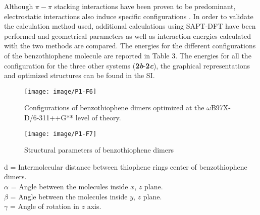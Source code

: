 	Although $\pi-\pi$ stacking interactions have been proven to be predominant, electrostatic interactions also induce specific configurations \cite{liu2014adjusting}. In order to validate the calculation method used, additional calculations using SAPT-DFT have been performed and geometrical parameters as well as interaction energies calculated with the two methods are compared. The energies for the different configurations of the benzothiophene molecule are reported in Table 3. The energies for all the configuration for the three other systems (\textbf{2\textit{b}}-\textbf{2\textit{c}}), the graphical representations and optimized structures can be found in the SI.
	
	
	\begin{figure}[H]
		\centering
		\texttt{[image: image/P1-F6]} \label{P1-F6}
		\caption{Configurations of benzothiophene dimers optimized at the $\omega$B97X-D/6-311++G** level of theory.}
	\end{figure}
	
	\begin{figure}[H]
		\centering
		\texttt{[image: image/P1-F7]}  \label{P1-F7}
		\caption{Structural parameters of benzothiophene dimers}
	\end{figure}
	
	\noindent d = Intermolecular distance between thiophene rings center of benzothiophene dimers.\\
	$\alpha$ = Angle between the molecules inside $x$, $z$ plane. \\
	$\beta$ = Angle between the molecules inside $y$, $z$ plane.\\
	$\gamma$ = Angle of rotation in $z$ axis.\\
	
